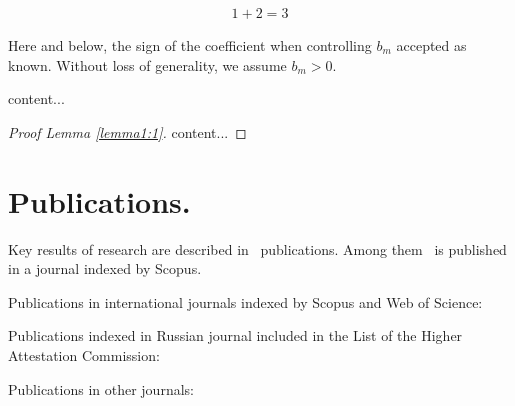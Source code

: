 \begin{align} %
	1+2=3
\end{align}

\begin{assumption-syn-en}
	Here and below, the sign of the coefficient when controlling $b_m$
	accepted as known. Without loss of generality, we assume $b_m >0$.
\end{assumption-syn-en}
\begin{lemma-syn-en} \label{lemma1:1}
	content...
\end{lemma-syn-en}

\begin{proof}[Proof Lemma \ref{lemma1:1}]
	content...
\end{proof}

\section*{Publications.}

Key results of research are described in \theAllMyPapers~publications. 
Among them
\theScopusPapers~is published in a journal indexed by Scopus. 


Publications in international journals indexed by Scopus and Web of Science:
\printPapperScopus

Publications indexed in Russian journal included in the List of the Higher Attestation Commission: 

Publications in other journals:
\printPapperOther
